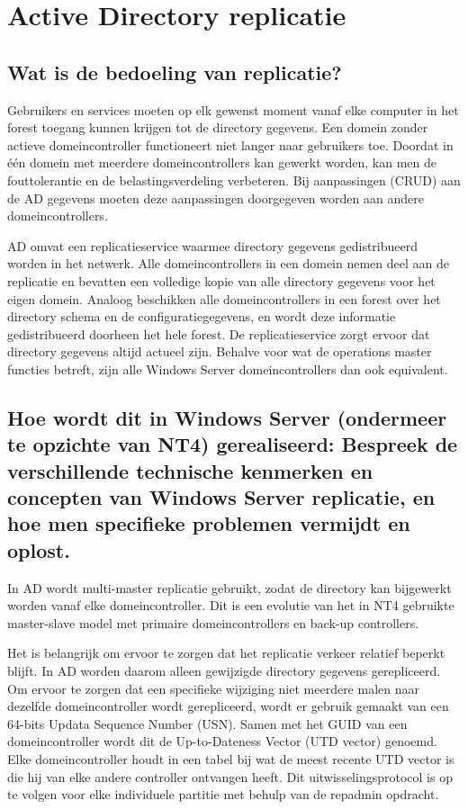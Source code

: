 \chapter{Active Directory replicatie}

\section{Wat is de bedoeling van replicatie?}

Gebruikers en services moeten op elk gewenst moment vanaf elke computer in het
forest toegang kunnen krijgen tot de directory gegevens. Een domein zonder
actieve domeincontroller functioneert niet langer naar gebruikers toe. Doordat
in één domein met meerdere domeincontrollers kan gewerkt worden, kan men de
fouttolerantie en de belastingsverdeling verbeteren. Bij aanpassingen (CRUD) aan
de AD gegevens moeten deze aanpassingen doorgegeven worden aan andere
domeincontrollers.

AD omvat een replicatieservice waarmee directory gegevens gedistribueerd worden
in het netwerk. Alle domeincontrollers in een domein nemen deel aan de
replicatie en bevatten een volledige kopie van alle directory gegevens voor het
eigen domein. Analoog beschikken alle domeincontrollers in een forest over het
directory schema en de configuratiegegevens, en wordt deze informatie
gedistribueerd doorheen het hele forest. De replicatieservice zorgt ervoor dat
directory gegevens altijd actueel zijn. Behalve voor wat de operations master
functies betreft, zijn alle Windows Server domeincontrollers dan ook equivalent.

\section{Hoe wordt dit in Windows Server (ondermeer te opzichte van NT4)
gerealiseerd: Bespreek de verschillende technische kenmerken en concepten van
Windows Server replicatie, en hoe men specifieke problemen vermijdt en oplost.}

In AD wordt multi-master replicatie gebruikt, zodat de directory kan bijgewerkt
worden vanaf elke domeincontroller. Dit is een evolutie van het in NT4 gebruikte
master-slave model met primaire domeincontrollers en back-up controllers.

Het is belangrijk om ervoor te zorgen dat het replicatie verkeer relatief
beperkt blijft. In AD worden daarom alleen gewijzigde directory gegevens
gerepliceerd. Om ervoor te zorgen dat een specifieke wijziging niet meerdere
malen naar dezelfde domeincontroller wordt gerepliceerd, wordt er gebruik
gemaakt van een 64-bits Updata Sequence Number (USN). Samen met het GUID van een
domeincontroller wordt dit de Up-to-Dateness Vector (UTD vector) genoemd. Elke
domeincontroller houdt in een tabel bij wat de meest recente UTD vector is die
hij van elke andere controller ontvangen heeft. Dit uitwisselingsprotocol is op
te volgen voor elke individuele partitie met behulp van de repadmin opdracht.


